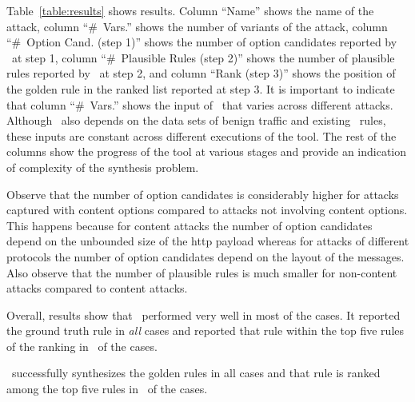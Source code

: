 \documentclass[conference]{IEEEtran}
\begin{document}
Table~\ref{table:results} shows results. Column ``Name'' shows the
name of the attack, column ``\#~Vars.'' shows the number of variants
of the attack, column ``\#~Option Cand. (step 1)'' shows the number of
option candidates reported by \tname\ at step 1, column ``\#~Plausible
Rules (step 2)'' shows the number of plausible rules reported by
\tname\ at step 2, and column ``Rank (step 3)'' shows the position of the
golden rule in the ranked list reported at step 3.
It is important to indicate that column ``\#~Vars.'' shows the input of
\tname\ that varies across different attacks. Although \tname\ also
depends on the data sets of benign traffic and existing \suri\ rules,
these inputs are constant across different executions of the tool. The
rest of the columns show the progress of the tool at various stages
and provide an indication of complexity of the synthesis problem.

Observe that the number of option candidates is considerably higher
for attacks captured with content options compared to attacks not
involving content options. This happens because for content attacks
the number of option candidates depend on the unbounded size of the
http payload whereas for attacks of different protocols the number of
option candidates depend on the layout of the messages. Also observe
that the number of plausible rules is much smaller for non-content
attacks compared to content attacks.


Overall, results show that \tname\ performed very well in most of the
cases. It reported the ground truth rule in \emph{all} cases and
reported that rule within the top five rules of the ranking in
\percTopFiveRanking\ of the cases. 


\begin{center}
\begin{tcolorbox}[enhanced,width=3.3in,center upper,drop shadow southwest,sharp corners]
\tname\ successfully synthesizes the golden rules in all cases and
that rule is ranked among the top five rules in
\percTopFiveRanking\ of the cases.
\end{tcolorbox}
\end{center}
\end{document}
